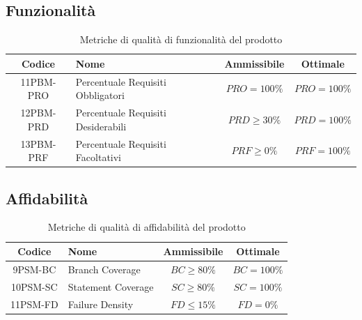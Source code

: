 \documentclass{article}
\begin{document}
    \subsection{Funzionalità}
    \begin{table}[H]
        \centering
        \renewcommand{\arraystretch}{1.5} %
        \begin{tabular}{|c|l|c|c|}
            \hline
            \textbf{Codice} & \textbf{Nome} & \textbf{Ammissibile} & \textbf{Ottimale} \\
            \hline
            11PBM-PRO & Percentuale Requisiti Obbligatori & $PRO = 100\%$ & $PRO = 100\%$ \\
            12PBM-PRD & Percentuale Requisiti Desiderabili & $PRD \geq 30\%$ & $PRD = 100\%$ \\
            13PBM-PRF & Percentuale Requisiti Facoltativi & $PRF \geq 0\%$ & $PRF = 100\%$ \\
            \hline
        \end{tabular}
        \label{tab:analisi_requisiti}
        \caption{Metriche di qualità di funzionalità del prodotto}
    \end{table}

    \subsection{Affidabilità}
    \begin{table}[H]
        \centering
        \renewcommand{\arraystretch}{1.5} %
        \begin{tabular}{|c|l|c|c|}
            \hline
            \textbf{Codice} & \textbf{Nome} & \textbf{Ammissibile} & \textbf{Ottimale} \\
            \hline
            9PSM-BC & Branch Coverage & $BC \geq 80\%$ & $BC = 100\%$ \\
            10PSM-SC & Statement Coverage & $SC \geq 80\%$ & $SC = 100\%$ \\
            11PSM-FD & Failure Density & $FD \leq 15\%$ & $FD = 0\%$ \\
            \hline
        \end{tabular}
        \label{tab:verifica}
        \caption{Metriche di qualità di affidabilità del prodotto}
    \end{table}
\end{document}
